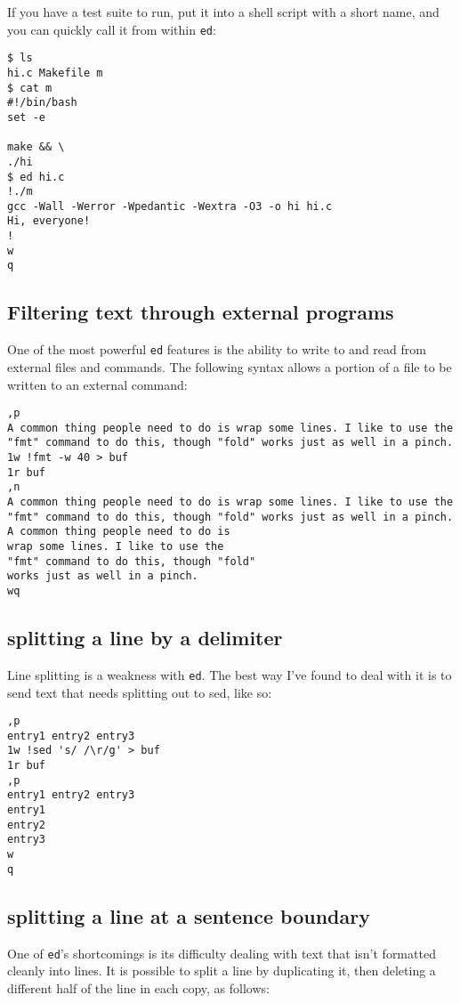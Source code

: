\documentclass[12pt]{article}
\begin{document}
If you have a test suite to run, put it into a shell script with a short name, and you can
quickly call it from within \lstinline{ed}:

\begin{lstlisting}
$ ls
hi.c Makefile m
$ cat m
#!/bin/bash
set -e

make && \
./hi
$ ed hi.c
!./m
gcc -Wall -Werror -Wpedantic -Wextra -O3 -o hi hi.c
Hi, everyone!
!
w
q
\end{lstlisting}

\subsection{Filtering text through external programs}

One of the most powerful \lstinline{ed} features is the ability to write to and read
from external files and commands. The following syntax allows a portion of a file to be written
to an external command:

\begin{lstlisting}
,p
A common thing people need to do is wrap some lines. I like to use the "fmt" command to do this, though "fold" works just as well in a pinch.
1w !fmt -w 40 > buf
1r buf
,n
A common thing people need to do is wrap some lines. I like to use the "fmt" command to do this, though "fold" works just as well in a pinch.
A common thing people need to do is
wrap some lines. I like to use the
"fmt" command to do this, though "fold"
works just as well in a pinch.
wq
\end{lstlisting}

\subsection{splitting a line by a delimiter}

Line splitting is a weakness with \lstinline{ed}. The best way I've found
to deal with it is to send text that needs splitting out to sed, like so:

\begin{lstlisting}
,p
entry1 entry2 entry3
1w !sed 's/ /\r/g' > buf
1r buf
,p
entry1 entry2 entry3
entry1
entry2
entry3
w
q
\end{lstlisting}

\subsection{splitting a line at a sentence boundary}

One of \lstinline{ed}'s shortcomings is its difficulty dealing with text that isn't
formatted cleanly into lines. It is possible
to split a line by duplicating it, then deleting a different half of the line in each copy, as follows:
\end{document}
